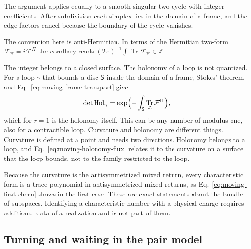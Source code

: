 \documentclass[11pt]{article}
\theoremstyle{definition}
\DeclareMathOperator{\Tr}{Tr}
\begin{document}
The argument applies equally to a smooth singular two-cycle with integer coefficients. After subdivision each simplex lies in the domain of a frame, and the edge factors cancel because the boundary of the cycle vanishes.

The convention here is anti-Hermitian. In terms of the Hermitian two-form $\mathcal F_{\mathrm H}=i\mathcal F^\Pi$ the corollary reads $(2\pi)^{-1}\int\Tr\mathcal F_{\mathrm H}\in\mathbb Z$.

The integer belongs to a closed surface. The holonomy of a loop is not quantized. For a loop $\gamma$ that bounds a disc $\mathsf S$ inside the domain of a frame, Stokes' theorem and Eq.~\eqref{eq:moving-frame-transport} give
\begin{equation}
 \det\operatorname{Hol}_\gamma=\exp\Bigl(-\int_{\mathsf S}\Tr_{\mathcal L}\mathcal F^\Pi\Bigr),
 \label{eq:moving-holonomy-flux}
\end{equation}
which for $r=1$ is the holonomy itself. This can be any number of modulus one, also for a contractible loop. Curvature and holonomy are different things. Curvature is defined at a point and needs two directions. Holonomy belongs to a loop, and Eq.~\eqref{eq:moving-holonomy-flux} relates it to the curvature on a surface that the loop bounds, not to the family restricted to the loop.

Because the curvature is the antisymmetrized mixed return, every characteristic form is a trace polynomial in antisymmetrized mixed returns, as Eq.~\eqref{eq:moving-first-chern} shows in the first case. These are exact statements about the bundle of subspaces. Identifying a characteristic number with a physical charge requires additional data of a realization and is not part of them.

\subsection{Turning and waiting in the pair model}
\label{subsec:moving-pair}
\end{document}
